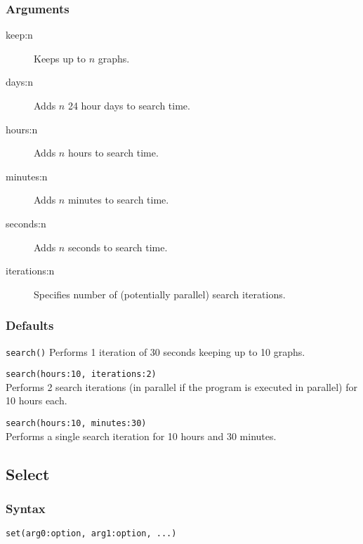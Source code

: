 	\subsubsection{Arguments}
	\begin{description}
		\item[keep:n] Keeps up to $n$ graphs.
		
		\item[days:n] Adds $n$ 24 hour days to search time.
		
		\item[hours:n] Adds $n$ hours to search time.
		
		\item[minutes:n] Adds $n$ minutes to search time.
		
		\item[seconds:n] Adds $n$ seconds to search time.
		
		\item[iterations:n] Specifies number of (potentially parallel) search iterations.
	\end{description}
		
	\subsubsection{Defaults}
		\texttt{search()} Performs 1 iteration of 30 seconds keeping up to 10 graphs.
		
	\begin{example}
		\item{\texttt{search(hours:10, iterations:2)}\\ Performs 2 search iterations (in parallel if the 
		program is executed in parallel) for 10 hours each.}
				
		\item{\texttt{search(hours:10, minutes:30)}\\ Performs a single search iteration for 10 
		hours and 30 minutes.}
	\end{example}
	
\subsection{Select}
	\subsubsection{Syntax}
		\texttt{set(arg0:option, arg1:option, ...)}
	
